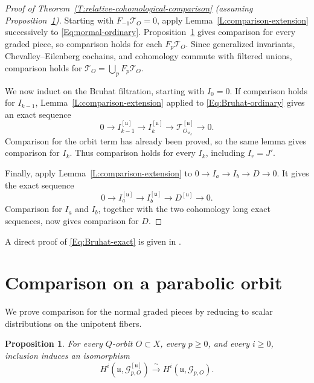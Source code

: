 \documentclass[a4paper,12pt]{amsart}
\numberwithin{equation}{section}
\theoremstyle{plain}
\newtheorem{proposition}[theorem]{Proposition}
\theoremstyle{definition}
\theoremstyle{remark}
\begin{document}
\begin{proof}[Proof of Theorem~\ref{T:relative-cohomological-comparison} (assuming Proposition~\ref{P:normal-graded-comparison})]
Starting with $F_{-1}\mathcal T_O=0$, apply Lemma~\ref{L:comparison-extension} successively to \eqref{Eq:normal-ordinary}.
Proposition~\ref{P:normal-graded-comparison} gives comparison for every graded piece, so comparison holds for each $F_p\mathcal T_O$.
Since generalized invariants, Chevalley--Eilenberg cochains, and cohomology commute with filtered unions, comparison holds for $\mathcal T_O=\bigcup_pF_p\mathcal T_O$.

We now induct on the Bruhat filtration, starting with $I_0=0$.
If comparison holds for $I_{k-1}$, Lemma~\ref{L:comparison-extension} applied to \eqref{Eq:Bruhat-ordinary} gives an exact sequence
\begin{equation}\label{Eq:Bruhat-exact}
 0\longrightarrow I_{k-1}^{[\mathfrak u]}
 \longrightarrow I_k^{[\mathfrak u]}
 \longrightarrow\mathcal T_{O_{w_k}}^{[\mathfrak u]}
 \longrightarrow0.
\end{equation}
Comparison for the orbit term has already been proved, so the same lemma gives comparison for $I_k$.
Thus comparison holds for every $I_k$, including $I_r=J'$.

Finally, apply Lemma~\ref{L:comparison-extension} to $0\to I_a\to I_b\to D\to0$.
It gives the exact sequence
\[
 0\longrightarrow I_a^{[\mathfrak u]}
 \longrightarrow I_b^{[\mathfrak u]}
 \longrightarrow D^{[\mathfrak u]}\longrightarrow0.
\]
Comparison for $I_a$ and $I_b$, together with the two cohomology long exact sequences, now gives comparison for $D$.
\end{proof}

A direct proof of \eqref{Eq:Bruhat-exact} is given in \cite{Xiao}.

\section{Comparison on a parabolic orbit}\label{S:comparison-poly}

We prove comparison for the normal graded pieces by reducing to scalar distributions on the unipotent fibers.

\begin{proposition}\label{P:normal-graded-comparison}
For every $Q$-orbit $O\subset X$, every $p\geq0$, and every $i\geq0$, inclusion induces an isomorphism
\begin{equation}\label{Eq:parameter-comparison}
 H^i(\mathfrak u,\mathcal G_{p,O}^{[\mathfrak u]})
 \xrightarrow{\ \sim\ }H^i(\mathfrak u,\mathcal G_{p,O}).
\end{equation}
\end{proposition}
\end{document}
